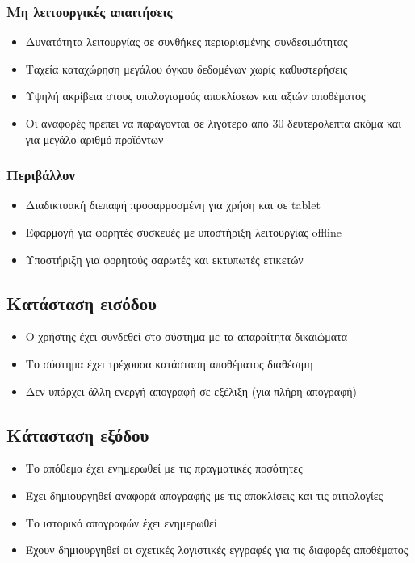 \documentclass[12pt,a4paper,twoside]{book}
\begin{document}
\subsubsection{Μη λειτουργικές απαιτήσεις}
\begin{itemize}
  \item Δυνατότητα λειτουργίας σε συνθήκες περιορισμένης συνδεσιμότητας
  \item Ταχεία καταχώρηση μεγάλου όγκου δεδομένων χωρίς καθυστερήσεις
  \item Υψηλή ακρίβεια στους υπολογισμούς αποκλίσεων και αξιών αποθέματος
  \item Οι αναφορές πρέπει να παράγονται σε λιγότερο από 30 δευτερόλεπτα ακόμα και για μεγάλο αριθμό προϊόντων
\end{itemize}

\subsubsection{Περιβάλλον}
\begin{itemize}
  \item Διαδικτυακή διεπαφή προσαρμοσμένη για χρήση και σε tablet
  \item Εφαρμογή για φορητές συσκευές με υποστήριξη λειτουργίας offline
  \item Υποστήριξη για φορητούς σαρωτές και εκτυπωτές ετικετών
\end{itemize}

\subsection{Κατάσταση εισόδου}
\begin{itemize}
  \item Ο χρήστης έχει συνδεθεί στο σύστημα με τα απαραίτητα δικαιώματα
  \item Το σύστημα έχει τρέχουσα κατάσταση αποθέματος διαθέσιμη
  \item Δεν υπάρχει άλλη ενεργή απογραφή σε εξέλιξη (για πλήρη απογραφή)
\end{itemize}

\subsection{Κάτασταση εξόδου}
\begin{itemize}
  \item Το απόθεμα έχει ενημερωθεί με τις πραγματικές ποσότητες
  \item Έχει δημιουργηθεί αναφορά απογραφής με τις αποκλίσεις και τις αιτιολογίες
  \item Το ιστορικό απογραφών έχει ενημερωθεί
  \item Έχουν δημιουργηθεί οι σχετικές λογιστικές εγγραφές για τις διαφορές αποθέματος
\end{itemize}
\end{document}
